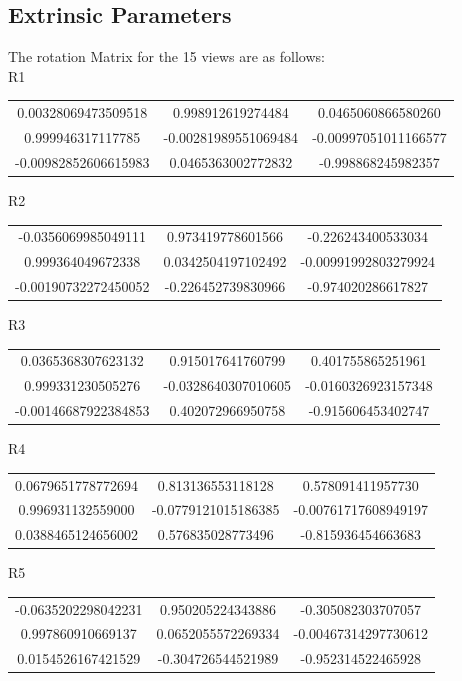\documentclass[12pt]{article}
\begin{document}
\subsection{Extrinsic Parameters}
The rotation Matrix for the 15 views are as follows:
\\
R1
\begin{tabular}{|c|c|c|}
\hline
0.00328069473509518	& 0.998912619274484 &	0.0465060866580260 \\
0.999946317117785	& -0.00281989551069484 &	-0.00997051011166577 \\
-0.00982852606615983 &	0.0465363002772832 &	-0.998868245982357 \\
\hline
\end{tabular}

R2
\begin{tabular}{|c|c|c|}
\hline
-0.0356069985049111	& 0.973419778601566 &	-0.226243400533034 \\
0.999364049672338 &	0.0342504197102492 &	-0.00991992803279924 \\
-0.00190732272450052 &	-0.226452739830966 &	-0.974020286617827 \\
\hline
\end{tabular}

R3
\begin{tabular}{|c|c|c|}
\hline
0.0365368307623132	& 0.915017641760799 &	0.401755865251961 \\
0.999331230505276 &	-0.0328640307010605 &	-0.0160326923157348 \\
-0.00146687922384853 &	0.402072966950758 &	-0.915606453402747 \\
\hline
\end{tabular}

R4
\begin{tabular}{|c|c|c|}
\hline
0.0679651778772694 & 0.813136553118128 &	0.578091411957730 \\
0.996931132559000 &	-0.0779121015186385 &	-0.00761717608949197 \\
0.0388465124656002	& 0.576835028773496 &	-0.815936454663683 \\
\hline
\end{tabular}

R5
\begin{tabular}{|c|c|c|}
\hline
-0.0635202298042231 & 0.950205224343886 &	-0.305082303707057 \\
0.997860910669137 &	0.0652055572269334 &	-0.00467314297730612 \\
0.0154526167421529 &	-0.304726544521989 &	-0.952314522465928 \\
\hline
\end{tabular}
\end{document}
